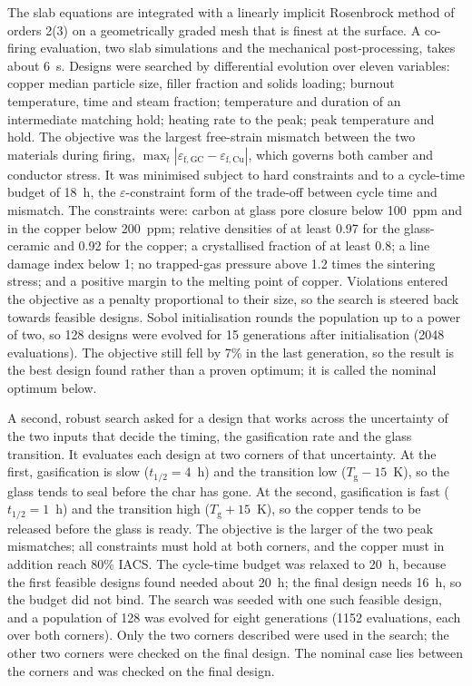 The slab equations are integrated with a linearly implicit Rosenbrock method of orders 2(3) \cite{shampine1997matlab} on a geometrically graded mesh that is finest at the surface. A co-firing evaluation, two slab simulations and the mechanical post-processing, takes about 6~s. Designs were searched by differential evolution \cite{storn1997differential} over eleven variables: copper median particle size, filler fraction and solids loading; burnout temperature, time and steam fraction; temperature and duration of an intermediate matching hold; heating rate to the peak; peak temperature and hold. The objective was the largest free-strain mismatch between the two materials during firing, $\max_t|\varepsilon_{\mathrm{f,GC}}-\varepsilon_{\mathrm{f,Cu}}|$, which governs both camber and conductor stress. It was minimised subject to hard constraints and to a cycle-time budget of 18~h, the $\varepsilon$-constraint form of the trade-off between cycle time and mismatch. The constraints were: carbon at glass pore closure below 100~ppm and in the copper below 200~ppm; relative densities of at least 0.97 for the glass-ceramic and 0.92 for the copper; a crystallised fraction of at least 0.8; a line damage index below 1; no trapped-gas pressure above 1.2 times the sintering stress; and a positive margin to the melting point of copper. Violations entered the objective as a penalty proportional to their size, so the search is steered back towards feasible designs. Sobol initialisation rounds the population up to a power of two, so 128 designs were evolved for 15 generations after initialisation (2048 evaluations). The objective still fell by 7\% in the last generation, so the result is the best design found rather than a proven optimum; it is called the nominal optimum below.

A second, robust search asked for a design that works across the uncertainty of the two inputs that decide the timing, the gasification rate and the glass transition. It evaluates each design at two corners of that uncertainty. At the first, gasification is slow ($t_{1/2} = 4$~h) and the transition low ($T_{\mathrm{g}} - 15$~K), so the glass tends to seal before the char has gone. At the second, gasification is fast ($t_{1/2} = 1$~h) and the transition high ($T_{\mathrm{g}} + 15$~K), so the copper tends to be released before the glass is ready. The objective is the larger of the two peak mismatches; all constraints must hold at both corners, and the copper must in addition reach 80\% IACS. The cycle-time budget was relaxed to 20~h, because the first feasible designs found needed about 20~h; the final design needs 16~h, so the budget did not bind. The search was seeded with one such feasible design, and a population of 128 was evolved for eight generations (1152 evaluations, each over both corners). Only the two corners described were used in the search; the other two corners were checked on the final design. The nominal case lies between the corners and was checked on the final design.


